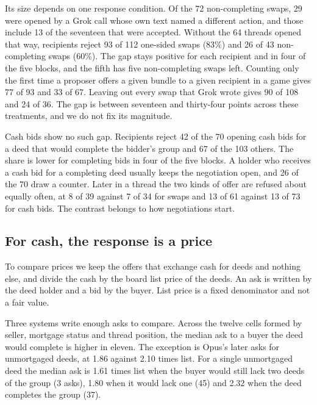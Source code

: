 \documentclass[11pt,letterpaper]{article}
\begin{document}
Its size depends on one response condition. Of the 72 non-completing swaps, 29 were opened by a Grok call whose own text named a different action, and those include 13 of the seventeen that were accepted. Without the 64 threads opened that way, recipients reject 93 of 112 one-sided swaps (83\%) and 26 of 43 non-completing swaps (60\%). The gap stays positive for each recipient and in four of the five blocks, and the fifth has five non-completing swaps left. Counting only the first time a proposer offers a given bundle to a given recipient in a game gives 77 of 93 and 33 of 67. Leaving out every swap that Grok wrote gives 90 of 108 and 24 of 36. The gap is between seventeen and thirty-four points across these treatments, and we do not fix its magnitude.

Cash bids show no such gap. Recipients reject 42 of the 70 opening cash bids for a deed that would complete the bidder's group and 67 of the 103 others. The share is lower for completing bids in four of the five blocks. A holder who receives a cash bid for a completing deed usually keeps the negotiation open, and 26 of the 70 draw a counter. Later in a thread the two kinds of offer are refused about equally often, at 8 of 39 against 7 of 34 for swaps and 13 of 61 against 13 of 73 for cash bids. The contrast belongs to how negotiations start.

\subsection{For cash, the response is a price}

To compare prices we keep the offers that exchange cash for deeds and nothing else, and divide the cash by the board list price of the deeds. An ask is written by the deed holder and a bid by the buyer. List price is a fixed denominator and not a fair value.

Three systems write enough asks to compare. Across the twelve cells formed by seller, mortgage status and thread position, the median ask to a buyer the deed would complete is higher in eleven. The exception is Opus's later asks for unmortgaged deeds, at 1.86 against 2.10 times list. For a single unmortgaged deed the median ask is 1.61 times list when the buyer would still lack two deeds of the group (3 asks), 1.80 when it would lack one (45) and 2.32 when the deed completes the group (37).
\end{document}
